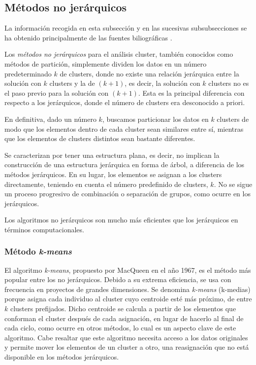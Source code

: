 \subsection{Métodos no jerárquicos} %

La información recogida en esta subsección y en las sucesivas subsubsecciones se ha obtenido principalmente de las fuentes biliográficas \cite{Bib-1, bejar-AC, Bib-2}.

Los \textit{métodos no jerárquicos} para el análisis cluster, también conocidos como métodos de partición, simplemente dividen los datos en un número predeterminado $k$
de clusters, donde no existe una relación jerárquica entre la solución con $k$ clusters y la de $(k+1)$, es decir, la solución con $k$ clusters no es el paso previo para
la solución con $(k+1)$. Esta es la principal diferencia con respecto a los jerárquicos, donde el número de clusters era desconocido a priori. \newline

En definitiva, dado un número $k$, buscamos particionar los datos en $k$ clusters de modo que los elementos dentro de cada cluster sean similares entre sí, mientras que los elementos 
de clusters distintos sean bastante diferentes.\newline

Se caracterizan por tener una estructura plana, es decir, no implican la construcción de una estructura jerárquica en forma de árbol, a diferencia de los métodos jerárquicos.
En su lugar, los elementos se asignan a los clusters directamente, teniendo en cuenta el número predefinido de clusters, $k$. No se sigue un proceso progresivo de combinación
o separación de grupos, como ocurre en los jerárquicos. \newline

\begin{nota}
    Los algoritmos no jerárquicos son mucho más eficientes que los jerárquicos en términos computacionales.
\end{nota}

\subsubsection{Método \textit{k-means}}

El algoritmo \textit{k-means}, propuesto por MacQueen en el año 1967, es el método más popular entre los no jerárquicos. Debido a su extrema eficiencia, se usa con frecuencia en proyectos de
grandes dimensiones. Se denomina \textit{k-means} (k-medias) porque asigna cada individuo al cluster cuyo centroide esté más próximo, de entre $k$ clusters prefijados. Dicho centroide se calcula 
a partir de los elementos que conforman el cluster después de cada asignación, en lugar de hacerlo al final de cada ciclo, como ocurre en otros métodos, lo cual es un aspecto
clave de este algoritmo. \newline
Cabe resaltar que este algoritmo necesita acceso a los datos originales y permite mover los elementos de un cluster a otro, una reasignación que no está disponible en los métodos 
jerárquicos. \newline

